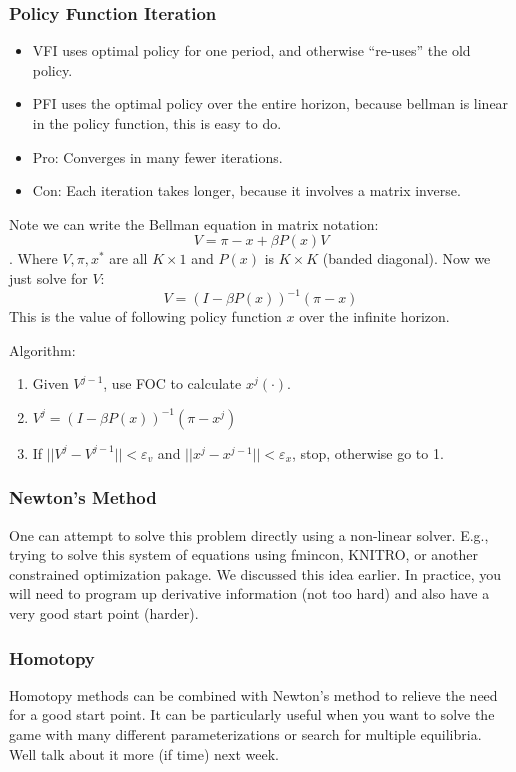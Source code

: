 \documentclass[twoside]{article}
\begin{document}
\subsubsection{Policy Function Iteration}
\begin{itemize}
\item VFI uses optimal policy for one period, and otherwise ``re-uses'' the old policy. 
\item PFI uses the optimal policy over the entire horizon, because bellman is linear in the policy function, this is easy to do. 
\item Pro: Converges in many fewer iterations. 
\item Con: Each iteration takes longer, because it involves a matrix inverse. 
\end{itemize}
Note we can write the Bellman equation in matrix notation: 
$$ V = \pi - x + \beta P(x) V$$. 
Where $V, \pi, x^*$ are all $K \times 1$ and $P(x)$ is $K \times K$ (banded diagonal). Now we just solve for $V$: 
$$ V = (I - \beta P(x))^{-1}(\pi - x)$$
This is the value of following policy function $x$ over the infinite horizon. 


Algorithm:
\begin{enumerate}
\item Given $V^{j-1}$, use FOC to calculate $x^j(\cdot)$. 
\item $V^j = (I - \beta P(x))^{-1}(\pi - x^j)$
\item If $||V^j - V^{j-1}|| < \varepsilon_v$ and $||x^j - x^{j-1}|| < \varepsilon_x$, stop, otherwise go to 1. 
\end{enumerate}

\subsubsection{Newton's Method}

One can attempt to solve this problem directly using a non-linear solver. E.g., trying to solve this 
system of equations using fmincon, KNITRO, or another constrained optimization pakage. 
We discussed this idea earlier.  In practice, you will need to program up derivative information (not too hard)
and also have a very good start point (harder). 

\subsubsection{Homotopy}

Homotopy methods can be combined with Newton's method to relieve the need for a good start point. It can 
be particularly useful when you want to solve the game with many different parameterizations or search for 
multiple equilibria. Well talk about it more (if time) next week.
\end{document}
